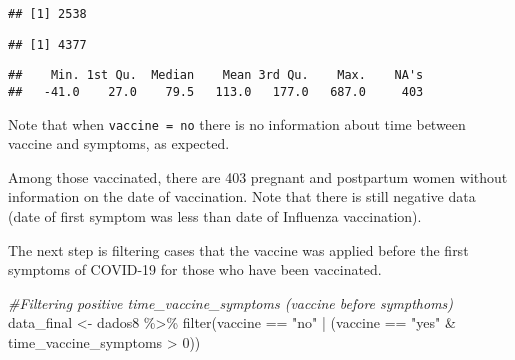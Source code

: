 \documentclass[
]{article}
\newenvironment{Shaded}{\begin{snugshade}}{\end{snugshade}}
\newcommand{\CommentTok}[1]{\textcolor[rgb]{0.56,0.35,0.01}{\textit{#1}}}
\newcommand{\DecValTok}[1]{\textcolor[rgb]{0.00,0.00,0.81}{#1}}
\newcommand{\FunctionTok}[1]{\textcolor[rgb]{0.00,0.00,0.00}{#1}}
\newcommand{\NormalTok}[1]{#1}
\newcommand{\OtherTok}[1]{\textcolor[rgb]{0.56,0.35,0.01}{#1}}
\newcommand{\SpecialCharTok}[1]{\textcolor[rgb]{0.00,0.00,0.00}{#1}}
\newcommand{\StringTok}[1]{\textcolor[rgb]{0.31,0.60,0.02}{#1}}
\begin{document}
\begin{verbatim}
## [1] 2538
\end{verbatim}

\begin{Shaded}
\end{Shaded}

\begin{verbatim}
## [1] 4377
\end{verbatim}

\begin{Shaded}
\end{Shaded}

\begin{verbatim}
##    Min. 1st Qu.  Median    Mean 3rd Qu.    Max.    NA's 
##   -41.0    27.0    79.5   113.0   177.0   687.0     403
\end{verbatim}

Note that when \texttt{vaccine\ =\ no} there is no information about
time between vaccine and symptoms, as expected.

Among those vaccinated, there are 403 pregnant and postpartum women
without information on the date of vaccination. Note that there is still
negative data (date of first symptom was less than date of Influenza
vaccination).

The next step is filtering cases that the vaccine was applied before the
first symptoms of COVID-19 for those who have been vaccinated.

\begin{Shaded}
\begin{Highlighting}[]
\CommentTok{\#Filtering positive time\_vaccine\_symptoms (vaccine before sympthoms)}
\NormalTok{data\_final }\OtherTok{\textless{}{-}}\NormalTok{ dados8 }\SpecialCharTok{\%\textgreater{}\%} 
  \FunctionTok{filter}\NormalTok{(vaccine }\SpecialCharTok{==} \StringTok{"no"} \SpecialCharTok{|}\NormalTok{ (vaccine }\SpecialCharTok{==} \StringTok{"yes"} \SpecialCharTok{\&}\NormalTok{ time\_vaccine\_symptoms }\SpecialCharTok{\textgreater{}} \DecValTok{0}\NormalTok{))}
\end{Highlighting}
\end{Shaded}
\end{document}
